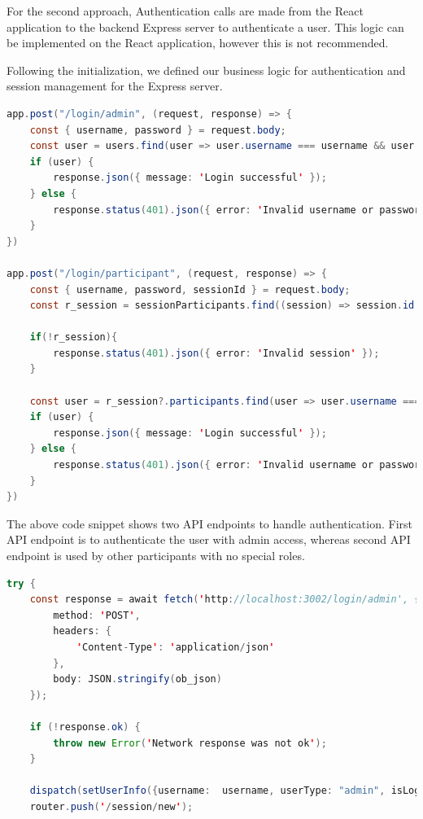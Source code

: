 For the second approach, Authentication calls are made from the React application to the backend Express server to authenticate a user. This logic can be implemented on the React application, however this is not recommended.

Following the initialization, we defined our business logic for authentication and session management for the Express server. 

\begin{lstlisting}[language=Java, caption=Authentication API Endpoints, label=lst:java, mathescape=true]
app.post("/login/admin", (request, response) => {
    const { username, password } = request.body;
    const user = users.find(user => user.username === username && user.password === password);
    if (user) {
        response.json({ message: 'Login successful' });
    } else {
        response.status(401).json({ error: 'Invalid username or password' });
    }
})

app.post("/login/participant", (request, response) => {
    const { username, password, sessionId } = request.body;
    const r_session = sessionParticipants.find((session) => session.id == sessionId)

    if(!r_session){
        response.status(401).json({ error: 'Invalid session' });
    }

    const user = r_session?.participants.find(user => user.username === username && user.password === password);
    if (user) {
        response.json({ message: 'Login successful' });
    } else {
        response.status(401).json({ error: 'Invalid username or password' });
    }
})
\end{lstlisting}

The above code snippet shows two API endpoints to handle authentication. First API endpoint is to authenticate the user with admin access, whereas second API endpoint is used by other participants with no special roles. 

\begin{lstlisting}[language=Java, caption=Authentication Request, label=lst:java, mathescape=true]
try {
    const response = await fetch('http://localhost:3002/login/admin', {
        method: 'POST',
        headers: {
            'Content-Type': 'application/json'
        },
        body: JSON.stringify(ob_json)
    });

    if (!response.ok) {
        throw new Error('Network response was not ok');
    }

    dispatch(setUserInfo({username:  username, userType: "admin", isLoggedIn: true}));    
    router.push('/session/new');
\end{lstlisting}

